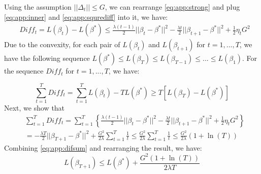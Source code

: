 	Using the assumption $||\Delta_t|| \leq G$, we can rearrange \eqref{eq:app:strong} and plug \eqref{eq:app:inner} and \eqref{eq:app:squrediff} into it, we have:	
	\begin{equation}\label{eq:app:it_diff}
	\begin{aligned}
	&{Diff}_t = L(\beta_t)-L(\beta^*)
	\le\frac{\lambda (t-1)}{2}{||{\beta _t} - {\beta ^*}||^2}- \frac{\lambda t}{2}{||{\beta _{t+1}} - {\beta ^*}||^2}+\frac{1}{2}{\eta _t} G^2
	\end{aligned}
	\end{equation}	
	Due to the convexity, for each pair of $L(\beta_t)$ and $L(\beta_{t+1})$ for $t=1,...,T$, 
	we have the following sequence $L(\beta^*) \leq L(\beta_T) \leq L(\beta_{T-1}) \leq...\leq L(\beta_1)$. 
	For the sequence $Diff_t$ for $t=1,...,T$, we have:
	
	\begin{equation} \label{eq:app:difsum}
	\sum_{t=1}^{T} Diff_t =  \sum_{t=1}^{T}L(\beta_t)-TL(\beta^*) \geq T\left[L(\beta_T)-L(\beta^*)\right]
	\end{equation}	
	Next, we show that 	
	\begin{equation}
	\begin{aligned}
	&\sum_{t=1}^{T} Diff_t =
	\sum_{t=1}^{T}\left\{\frac{\lambda (t-1)}{2}{||{\beta _t} - {\beta ^*}||^2}- \frac{\lambda t}{2}{||{\beta _{t+1}} - {\beta ^*}||^2}+\frac{1}{2}{\eta _t} G^2\right\} \\
	&=-\frac{\lambda T}{2}{||{\beta _{T+1}-\beta^*}||^2} + \frac{G^2}{2 \lambda}\sum_{t=1}^{T} \frac{1}{t}\leq \frac{G^2}{2 \lambda}\sum_{t=1}^{T} \frac{1}{t} \leq \frac{G^2}{2 \lambda}(1+\ln(T))
	\end{aligned}
	\end{equation}	
	Combining \eqref{eq:app:difsum} and rearranging the result, we have:
	\begin{equation*}
	L(\beta_{T+1}) \leq L(\beta^*)+\frac{G^2(1+\ln (T))}{2\lambda T}
	\end{equation*}

